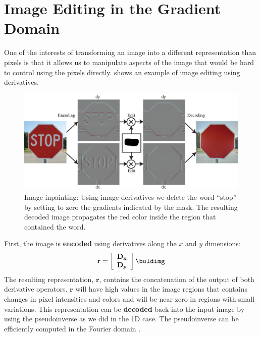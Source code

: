 \section{Image Editing in the Gradient Domain}
\label{section:editinggradientdomain}



One of the interests of transforming an image into a different representation than pixels is that it allows us to manipulate aspects of the image that would be hard to control using the pixels directly. \Fig{\ref{fig:edit_with_derivatives}} shows an example of image editing using derivatives.

\begin{figure}
	\centerline{
		\includegraphics[width=1\linewidth]{figures/derivatives/stop_impainting.eps}
	}
	\caption{Image inpainting: Using image derivatives we delete the word ``stop'' by setting to zero  the gradients indicated by the mask. The resulting decoded image propagates the red color inside the region that contained the word.}
	\label{fig:edit_with_derivatives}
\end{figure}


First, the image is {\bf encoded} using derivatives along the $x$ and $y$ dimensions:
\begin{equation}
	\mathbf{r} =
	\left[
		\begin{array}{c}
			\mathbf{D_x} \\
			\mathbf{D_y}
		\end{array}
		\right]
	\boldimg
\end{equation}
The resulting representation, $\mathbf{r}$, contains the concatenation of the output of  both derivative operators.  $\mathbf{r}$ will have high values in the image regions that contains changes in pixel intensities and colors and will be near zero in regions with small variations. This representation can be {\bf decoded} back into the input image by using the pseudoinverse as we did in the 1D case. The pseudoinverse can be efficiently computed in the Fourier domain \cite{Weiss01derivingintrinsic}.


